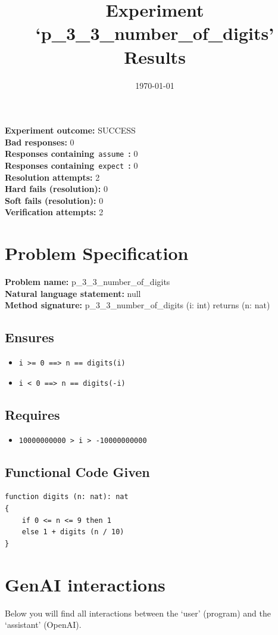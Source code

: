 \documentclass{article}
\begin{document}
\title{Experiment `p\_3\_3\_number\_of\_digits' Results}
\author{\today}
\date{}
\maketitle
\textbf{Experiment outcome: }SUCCESS
\\\textbf{Bad responses: }0
\\\textbf{Responses containing}~\texttt{assume}~\textbf{: }0
\\\textbf{Responses containing}~\texttt{expect}~\textbf{: }0
\\\textbf{Resolution attempts: }2
\\\textbf{Hard fails (resolution): }0
\\\textbf{Soft fails (resolution): }0
\\\textbf{Verification attempts: }2
\section*{Problem Specification}
\textbf{Problem name: }p\_3\_3\_number\_of\_digits
\\\textbf{Natural language statement: }null
\\\textbf{Method signature: }p\_3\_3\_number\_of\_digits (i: int) returns (n: nat)
\subsection*{Ensures}
\begin{itemize}
\item \texttt{i >= 0 ==> n == digits(i)}
\item \texttt{i < 0 ==> n == digits(-i)}
\end{itemize}
\subsection*{Requires}
\begin{itemize}
\item \texttt{10000000000 > i > -10000000000}
\end{itemize}
\subsection*{Functional Code Given}
\begin{lstlisting}
function digits (n: nat): nat
{
    if 0 <= n <= 9 then 1
    else 1 + digits (n / 10)
}
\end{lstlisting}
\clearpage
\section*{GenAI interactions}
Below you will find all interactions between the `user' (program) and the `assistant' (OpenAI).
\end{document}
